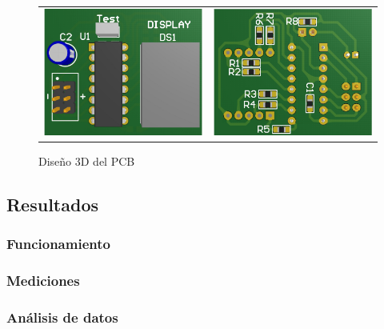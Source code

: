 \begin{figure}[H]
    \centering
    \begin{tabular}{c c}
        \includegraphics[scale=0.4]{../EJ7/Recursos/3d_top_visualizacion.PNG} &
        \includegraphics[scale=0.4]{../EJ7/Recursos/3d_bottom_visualizacion.PNG} 
    \end{tabular}
    \caption{Dise\~no 3D del PCB}
    \label{fig:3d_visualizacion}
\end{figure}

\subsection{Resultados}
\subsubsection{Funcionamiento}
\subsubsection{Mediciones}
\subsubsection{An\'alisis de datos}

